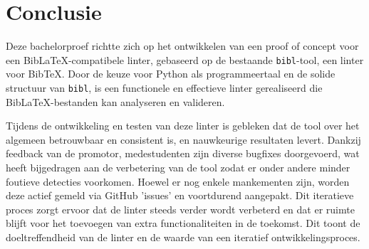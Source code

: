 
\chapter{Conclusie}%
\label{ch:conclusie}




Deze bachelorproef richtte zich op het ontwikkelen van een proof of concept voor een BibLaTeX-compatibele linter, gebaseerd op de bestaande \texttt{bibl}-tool, een linter voor BibTeX. Door de keuze voor Python als programmeertaal en de solide structuur van \texttt{bibl}, is een functionele en effectieve linter gerealiseerd die BibLaTeX-bestanden kan analyseren en valideren.

Tijdens de ontwikkeling en testen van deze linter is gebleken dat de tool over het algemeen betrouwbaar en consistent is, en nauwkeurige resultaten levert. Dankzij feedback van de promotor, medestudenten zijn diverse bugfixes doorgevoerd, wat heeft bijgedragen aan de verbetering van de tool zodat er onder andere minder foutieve detecties voorkomen. Hoewel er nog enkele mankementen zijn, worden deze actief gemeld via GitHub 'issues' en voortdurend aangepakt. Dit iteratieve proces zorgt ervoor dat de linter steeds verder wordt verbeterd en dat er ruimte blijft voor het toevoegen van extra functionaliteiten in de toekomst. Dit toont de doeltreffendheid van de linter en de waarde van een iteratief ontwikkelingsproces.

